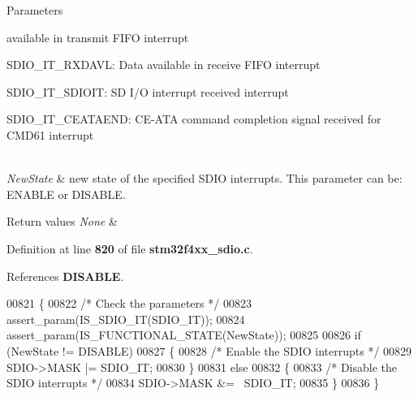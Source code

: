 \begin{DoxyParams}{Parameters}
\begin{DoxyItemize}
available in transmit F\+I\+FO interrupt \item S\+D\+I\+O\+\_\+\+I\+T\+\_\+\+R\+X\+D\+A\+VL\+: Data available in receive F\+I\+FO interrupt \item S\+D\+I\+O\+\_\+\+I\+T\+\_\+\+S\+D\+I\+O\+IT\+: SD I/O interrupt received interrupt \item S\+D\+I\+O\+\_\+\+I\+T\+\_\+\+C\+E\+A\+T\+A\+E\+ND\+: C\+E-\/\+A\+TA command completion signal received for C\+M\+D61 interrupt \end{DoxyItemize}
\\
\hline
{\em New\+State} & new state of the specified S\+D\+IO interrupts. This parameter can be\+: E\+N\+A\+B\+LE or D\+I\+S\+A\+B\+LE. \\
\hline
\end{DoxyParams}

\begin{DoxyRetVals}{Return values}
{\em None} & \\
\hline
\end{DoxyRetVals}


Definition at line \textbf{ 820} of file \textbf{ stm32f4xx\+\_\+sdio.\+c}.



References \textbf{ D\+I\+S\+A\+B\+LE}.


\begin{DoxyCode}
00821 \{
00822   \textcolor{comment}{/* Check the parameters */}
00823   assert_param(IS_SDIO_IT(SDIO\_IT));
00824   assert_param(IS_FUNCTIONAL_STATE(NewState));
00825   
00826   \textcolor{keywordflow}{if} (NewState != DISABLE)
00827   \{
00828     \textcolor{comment}{/* Enable the SDIO interrupts */}
00829     SDIO->MASK |= SDIO\_IT;
00830   \}
00831   \textcolor{keywordflow}{else}
00832   \{
00833     \textcolor{comment}{/* Disable the SDIO interrupts */}
00834     SDIO->MASK &= ~SDIO\_IT;
00835   \} 
00836 \}
\end{DoxyCode}
